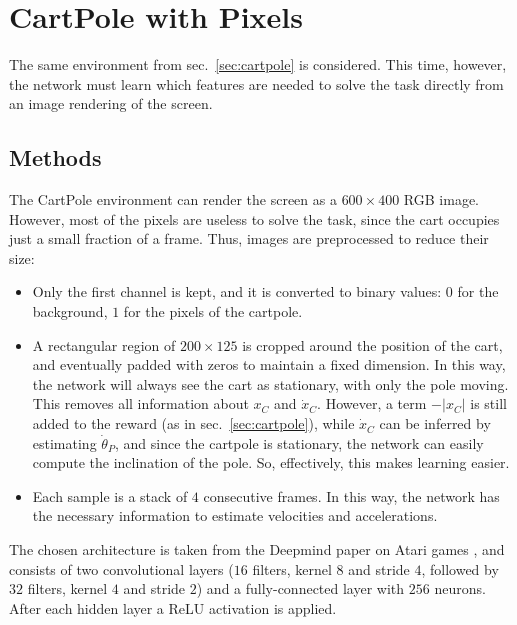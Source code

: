 \documentclass[11pt,a4paper]{scrartcl}
\begin{document}
\section{CartPole with Pixels \label{sec:cartpole_pixels}}
The same environment from sec.~\ref{sec:cartpole} is considered. This time, however, the network must learn which features are needed to solve the task directly from an image rendering of the screen. 

\vspace{-.5em}
\subsection{Methods}
The CartPole environment can render the screen as a $600 \times 400$ RGB image. However, most of the pixels are useless to solve the task, since the cart occupies just a small fraction of a frame. Thus, images are preprocessed to reduce their size:
\begin{itemize}
    \item Only the first channel is kept, and it is converted to binary values: $0$ for the background, $1$ for the pixels of the cartpole.
    \item A rectangular region of $200 \times 125$ is cropped around the position of the cart, and eventually padded with zeros to maintain a fixed dimension. In this way, the network will always see the cart as stationary, with only the pole moving. This removes all information about $x_C$ and $\dot{x}_C$. However, a term $-|x_C|$ is still added to the reward (as in sec.~\ref{sec:cartpole}), while $\dot{x}_C$ can be inferred by estimating $\dot{\theta}_P$, and since the cartpole is stationary, the network can easily compute the inclination of the pole. So, effectively, this makes learning easier.
    \item Each sample is a stack of $4$ consecutive frames. In this way, the network has the necessary information to estimate velocities and accelerations.
\end{itemize}

The chosen architecture is taken from the Deepmind paper on Atari games \cite{deepmind_atari}, and consists of two convolutional layers ($16$ filters, kernel $8$ and stride $4$, followed by $32$ filters, kernel $4$ and stride $2$) and a fully-connected layer with $256$ neurons. After each hidden layer a ReLU activation is applied.
\end{document}
